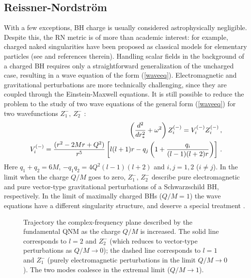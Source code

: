 \documentclass[]{iopart}
\def\beq{\begin{eqnarray}}
\def\eeq{\end{eqnarray}}
\def\nn{\nonumber}
\begin{document}
\subsection{\label{sec:qnmrn}Reissner-Nordstr\"om}

With a few exceptions, BH charge is usually considered astrophysically
negligible. Despite this, the RN metric is of more than academic interest: for
example, charged naked singularities have been proposed as classical models
for elementary particles (see \cite{Berti:2005eb} and references therein).
Handling scalar fields in the background of a charged BH requires only a
straightforward generalization of the uncharged case, resulting in a wave
equation of the form (\ref{waveeq}).  Electromagnetic and gravitational
perturbations are more technically challenging, since they are coupled through
the Einstein-Maxwell equations. It is still possible to reduce the problem to
the study of two wave equations of the general form (\ref{waveeq}) for two
wavefunctions $Z_1^{-},\,Z_2^{-}$ \cite{MTB}:
%
%
\beq\label{axialRN}
\left({d^2\over dr_*^2}+\omega^2\right)Z_i^{(-)}=V_i^{(-)}Z_i^{(-)}\,,\\
V_i^{(-)}=\frac{(r^2-2Mr+Q^2)}{r^5}\left[l(l+1)r-q_j
\left(
1+\frac{q_i}{(l-1)(l+2)r}
\right)\right]\,.
\nn
\eeq
%
Here $q_1+q_2=6M$, $-q_1q_2=4Q^2(l-1)(l+2)$ and $i,j=1,2$ ($i\neq j$). In the
limit when the charge $Q/M$ goes to zero, $Z_1^-,\,Z_2^-$ describe pure
electromagnetic and pure vector-type gravitational perturbations of a
Schwarzschild BH, respectively.  In the limit of maximally charged BHs
($Q/M=1$) the wave equations have a different singularity structure, and
deserve a special treatment \cite{Onozawa:1995vu}.

\begin{figure}[ht]
\begin{center}
\caption{Trajectory the complex-frequency plane described by the fundamental
  QNM as the charge $Q/M$ is increased. The solid line corresponds to $l=2$
  and $Z_2^-$ (which reduces to vector-type perturbations as $Q/M\to 0$); the
  dashed line corresponds to $l=1$ and $Z_1^-$ (purely electromagnetic
  perturbations in the limit $Q/M\to 0$).  The two modes coalesce in the
  extremal limit ($Q/M\to 1$).}
\label{fig:figrn}
\end{center}
\end{figure}
\end{document}
